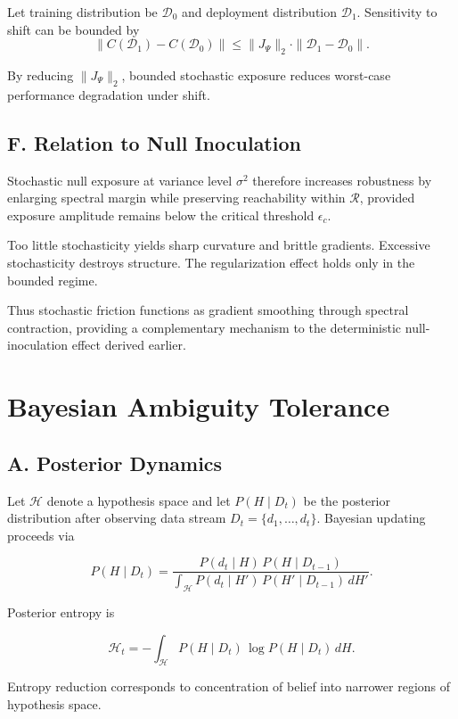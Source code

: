 \documentclass[11pt]{article}
\theoremstyle{remark}
\begin{document}
Let training distribution be $\mathcal{D}_0$ and deployment distribution $\mathcal{D}_1$. Sensitivity to shift can be bounded by
\[
\|C(\mathcal{D}_1) - C(\mathcal{D}_0)\|
\le
\|J_\Psi\|_2 \cdot \|\mathcal{D}_1 - \mathcal{D}_0\|.
\]

By reducing $\|J_\Psi\|_2$, bounded stochastic exposure reduces worst-case performance degradation under shift.

\subsection*{F. Relation to Null Inoculation}

Stochastic null exposure at variance level $\sigma^2$ therefore increases robustness by enlarging spectral margin while preserving reachability within $\mathcal{R}$, provided exposure amplitude remains below the critical threshold $\epsilon_c$.

Too little stochasticity yields sharp curvature and brittle gradients. Excessive stochasticity destroys structure. The regularization effect holds only in the bounded regime.

Thus stochastic friction functions as gradient smoothing through spectral contraction, providing a complementary mechanism to the deterministic null-inoculation effect derived earlier.

\section{Bayesian Ambiguity Tolerance}
\label{app:bayesian}

\subsection*{A. Posterior Dynamics}

Let $\mathcal{H}$ denote a hypothesis space and let $P(H \mid D_t)$ be the posterior distribution after observing data stream $D_t = \{d_1,\dots,d_t\}$. Bayesian updating proceeds via

\[
P(H \mid D_{t})
=
\frac{P(d_t \mid H)\, P(H \mid D_{t-1})}
{\int_{\mathcal{H}} P(d_t \mid H')\, P(H' \mid D_{t-1})\, dH'}.
\]

Posterior entropy is

\[
\mathcal{H}_t
=
- \int_{\mathcal{H}} P(H \mid D_t)\,
\log P(H \mid D_t)\, dH.
\]

Entropy reduction corresponds to concentration of belief into narrower regions of hypothesis space.
\end{document}
